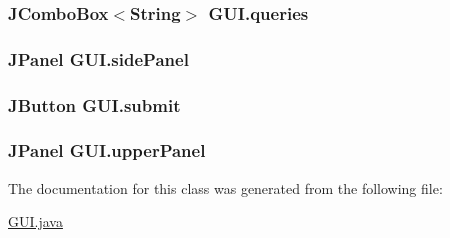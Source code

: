 \subsubsection[{\texorpdfstring{queries}{queries}}]{\setlength{\rightskip}{0pt plus 5cm}J\+Combo\+Box$<$String$>$ G\+U\+I.\+queries\hspace{0.3cm}{\ttfamily [private]}}\hypertarget{classGUI_ac15dd4c4cf3422b2e3ad7209b70b2df2}{}\label{classGUI_ac15dd4c4cf3422b2e3ad7209b70b2df2}
\subsubsection[{\texorpdfstring{side\+Panel}{sidePanel}}]{\setlength{\rightskip}{0pt plus 5cm}J\+Panel G\+U\+I.\+side\+Panel\hspace{0.3cm}{\ttfamily [private]}}\hypertarget{classGUI_a6930a3cfc244b0ce0d03e3fab60d33c7}{}\label{classGUI_a6930a3cfc244b0ce0d03e3fab60d33c7}
\subsubsection[{\texorpdfstring{submit}{submit}}]{\setlength{\rightskip}{0pt plus 5cm}J\+Button G\+U\+I.\+submit\hspace{0.3cm}{\ttfamily [private]}}\hypertarget{classGUI_a4a469da0727abf52b86e23b12ca91fc6}{}\label{classGUI_a4a469da0727abf52b86e23b12ca91fc6}
\subsubsection[{\texorpdfstring{upper\+Panel}{upperPanel}}]{\setlength{\rightskip}{0pt plus 5cm}J\+Panel G\+U\+I.\+upper\+Panel\hspace{0.3cm}{\ttfamily [private]}}\hypertarget{classGUI_a5ae695a244b7bf0e35c5387063d0a6ae}{}\label{classGUI_a5ae695a244b7bf0e35c5387063d0a6ae}


The documentation for this class was generated from the following file\+:\begin{DoxyCompactItemize}
\item 
\hyperlink{GUI_8java}{G\+U\+I.\+java}\end{DoxyCompactItemize}
